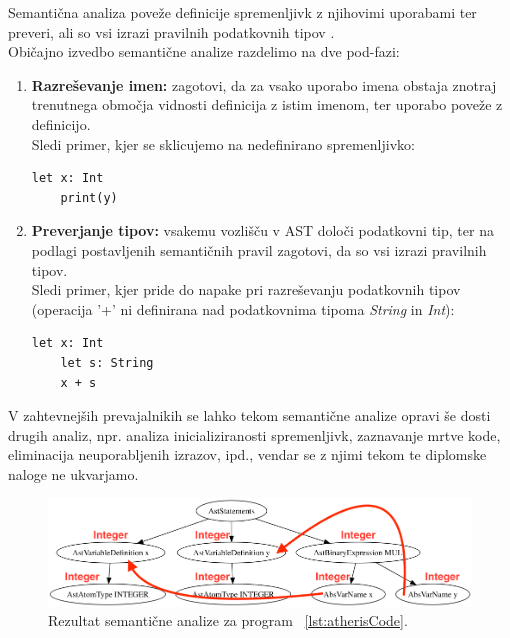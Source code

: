 \documentclass[a4paper, 12p]{book}
\begin{document}
Semantična analiza poveže definicije spremenljivk z njihovimi uporabami ter preveri, ali so vsi izrazi pravilnih podatkovnih tipov \cite{modernCompiler}. \\
\indent Običajno izvedbo semantične analize razdelimo na dve pod-fazi:
\begin{enumerate}
	\item \textbf{Razreševanje imen:} zagotovi, da za vsako uporabo imena obstaja znotraj trenutnega območja vidnosti definicija z istim imenom, ter uporabo poveže z definicijo. \\
	Sledi primer, kjer se sklicujemo na nedefinirano spremenljivko:
	
	\renewcommand{\lstlistingname}{Program}
	\begin{lstlisting}[caption={Primer programa, kjer spremenljivka \textit{y} ni definirana.},label={lst:atherisCodeNameError},captionpos=b]
	let x: Int
	print(y)
	\end{lstlisting}
	
	\item \textbf{Preverjanje tipov:} vsakemu vozlišču v AST določi podatkovni tip, ter na podlagi postavljenih semantičnih pravil zagotovi, da so vsi izrazi pravilnih tipov. \\
	Sledi primer, kjer pride do napake pri razreševanju podatkovnih tipov (operacija '+' ni definirana nad podatkovnima tipoma \textit{String} in \textit{Int}):
	
	\renewcommand{\lstlistingname}{Program}
	\begin{lstlisting}[caption={Primer programa, kjer je napaka v podatkovnih tipih.},label={lst:atherisCodeTypeError},captionpos=b]
	let x: Int
	let s: String
	x + s
	\end{lstlisting}
	
\end{enumerate}

V zahtevnejših prevajalnikih se lahko tekom semantične analize opravi še dosti drugih analiz, npr. analiza inicializiranosti spremenljivk, zaznavanje mrtve kode, eliminacija neuporabljenih izrazov, ipd., vendar se z njimi tekom te diplomske naloge ne ukvarjamo.

\begin{figure}[h]
	\begin{center}
		\includegraphics[width=1\textwidth]{resources/astSeman.png}
	\end{center}
	\caption{Rezultat semantične analize za program ~\ref{lst:atherisCode}.}
	\label{image:astSeman}
\end{figure}
\end{document}
